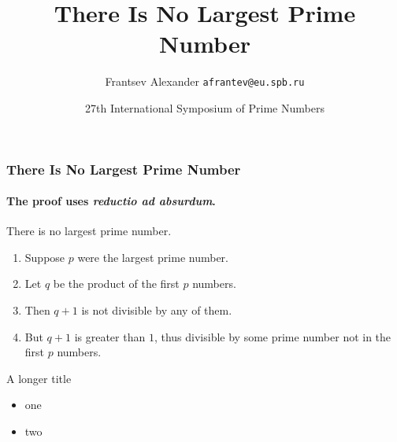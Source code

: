 \documentclass{beamer}
\title{There Is No Largest Prime Number}
\date[ISPN ’80]{27th International Symposium of Prime Numbers}
\author[Frantsev]{Frantsev Alexander \texttt{afrantev@eu.spb.ru}}
\begin{document}
\begin{frame}
\titlepage
\end{frame}

\begin{frame} 
\frametitle{There Is No Largest Prime Number} 
\framesubtitle{The proof uses \textit{reductio ad absurdum}.} 
\begin{theorem}
There is no largest prime number. \end{theorem} 
\begin{enumerate} 
\item<1-| alert@1> Suppose $p$ were the largest prime number. 
\item<2-> Let $q$ be the product of the first $p$ numbers. 
\item<3-> Then $q+1$ is not divisible by any of them. 
\item<1-> But $q + 1$ is greater than $1$, thus divisible by some prime
number not in the first $p$ numbers.
\end{enumerate}
\end{frame}

\begin{frame}{A longer title}
\begin{itemize}
\item one
\item two
\end{itemize}
\end{frame}
\end{document}
